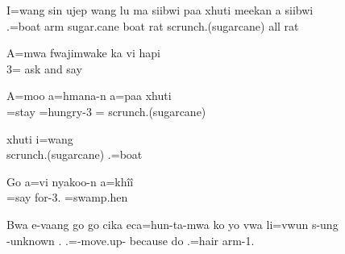 \z
\ea%

\gll I=wang sin ujep wang lu ma siibwi paa xhuti meekan a siibwi\\ .=boat arm sugar.cane boat   rat  scrunch.(sugarcane) all  rat\\ \glt {}

\z
\ea%

\gll A=mwa fwajimwake ka vi hapi
\\ 3= ask and say 
\\ \glt {}

\z
\ea%

\gll A=moo a=hmana-n a=paa xhuti\\ 
=stay =hungry-3 = scrunch.(sugarcane)\\ 
\glt {}

\z
\ea%

\gll xhuti i=wang\\ 
scrunch.(sugarcane) .=boat\\ 
\glt {}

\z
\ea%

\gll Go a=vi nyakoo-n a=khîî\\ 
 =say for-3. =swamp.hen\\
 \glt {}

\z
\ea%

\gll Bwa e-vaang go go cika eca=hun-ta-mwa ko yo vwa li=vwun s-ung\\  -unknown   . .=-move.up- because  do .=hair arm-1.\\ \glt {}

\z
\ea%


